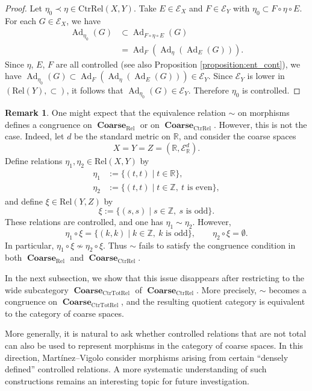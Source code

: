 \documentclass[12pt, a4paper]{amsart}
\theoremstyle{definition}
\newtheorem{remark}[theorem]{Remark}
\newcommand{\Ad}{\mathop{\mathrm{Ad}}\nolimits}
\newcommand{\Z}{\mathbb{Z}}
\newcommand{\R}{\mathbb{R}}
\newcommand{\Coarse}{\mathop{\mathbf{Coarse}}\nolimits}
\newcommand{\Rel}{\mathrm{Rel}}
\newcommand{\CtrTotRel}{\mathrm{CtrTotRel}}
\newcommand{\CtrRel}{\mathrm{CtrRel}}
\begin{document}
\begin{proof}
Let $\eta_0 \prec \eta\in\CtrRel(X,Y)$.
Take $E \in \mathcal{E}_X$ and $F \in \mathcal{E}_Y$ with $\eta_0 \subset F \circ \eta \circ E$.
For each $G \in \mathcal{E}_X$, we have
\begin{align*}
 \Ad_{\eta_0}(G)
    &\subset \Ad_{F \circ \eta \circ E}(G) \\
    &= \Ad_{F}(\Ad_{\eta}(\Ad_{E}(G))).
\end{align*}
Since $\eta$, $E$, $F$ are all controlled (see also Proposition \ref{proposition:ent_cont}), 
we have $\Ad_{\eta_0}(G) \subset \Ad_{F}(\Ad_{\eta}(\Ad_{E}(G))) \in \mathcal{E}_Y$.
Since $\mathcal{E}_Y$ is lower in $(\Rel(Y),\subset)$,
it follows that
$\Ad_{\eta_0}(G)\in\mathcal{E}_Y$.
Therefore $\eta_0$ is controlled.
\end{proof}

\begin{remark}
One might expect that the equivalence relation $\sim$ on morphisms defines a
congruence on $\Coarse_{\Rel}$ or on $\Coarse_{\CtrRel}$.
However, this is not the case. 
Indeed, let $d$ be the standard metric on $\R$, and consider the coarse
spaces
\[
X=Y=Z=(\R,\mathcal{E}_{\R}^{d}).
\]
Define relations $\eta_1,\eta_2\in\Rel(X,Y)$ by
\begin{align*}
\eta_1 &:= \{(t,t)\mid t\in\R\},\\
\eta_2 &:= \{(t,t)\mid t\in\Z,\ t \text{ is even}\},
\end{align*}
and define $\xi\in\Rel(Y,Z)$ by
\[
\xi:=\{(s,s)\mid s\in\Z,\ s \text{ is odd}\}.
\]
These relations are controlled, and one has
$\eta_1\sim\eta_2$.
However,
\[
\eta_1\circ\xi
=
\{(k,k)\mid k\in\Z,\ k \text{ is odd}\},
\qquad
\eta_2\circ\xi
=
\emptyset.
\]
In particular,
$\eta_1\circ\xi\not\sim\eta_2\circ\xi$.
Thus $\sim$ fails to satisfy the congruence condition in both
$\Coarse_{\Rel}$ and $\Coarse_{\CtrRel}$.

In the next subsection, we show that this issue disappears after restricting
to the wide subcategory $\Coarse_{\CtrTotRel}$ of $\Coarse_{\CtrRel}$.
More precisely, $\sim$ becomes a congruence on
$\Coarse_{\CtrTotRel}$, and the resulting quotient category is equivalent to
the category of coarse spaces.

More generally, it is natural to ask whether controlled relations that are
not total can also be used to represent morphisms in the category of coarse
spaces. In this direction, Mart\'{i}nez--Vigolo
\cite{MartinezVigolo2026roe} consider morphisms arising from certain
``densely defined'' controlled relations. A more systematic understanding of
such constructions remains an interesting topic for future investigation.
\end{remark}
\end{document}
